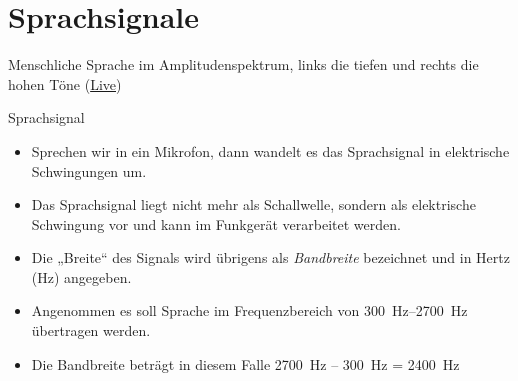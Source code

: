 
\section{Sprachsignale}
\label{section:sprachsignale}

\begin{frame}%
    \centering
    \resizebox{0.9\linewidth}{!}{}
    Menschliche Sprache im Amplitudenspektrum, links die tiefen und rechts die hohen Töne (\href{https://50ohm.de/N_slide_n_modulation.html\#/3/1}{Live})
\end{frame}

\begin{frame}{Sprachsignal}
    \begin{itemize}
        \item Sprechen wir in ein Mikrofon, dann wandelt es das Sprachsignal in elektrische Schwingungen um.
        \item Das Sprachsignal liegt nicht mehr als Schallwelle, sondern als elektrische Schwingung vor und kann im Funkgerät verarbeitet werden.
        \item Die „Breite“ des Signals wird übrigens als \emph{Bandbreite} bezeichnet und in Hertz (Hz) angegeben.
        \item Angenommen es soll Sprache im Frequenzbereich von \qtyrange{300}{2700}{\hertz} übertragen werden.
        \item Die Bandbreite beträgt in diesem Falle \qty{2700}{\hertz} – \qty{300}{\hertz} = \qty{2400}{\hertz}
    \end{itemize}
\end{frame}

\begin{frame}
\end{frame}%
